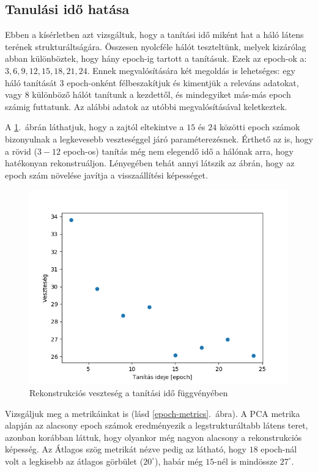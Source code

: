 \subsection{Tanulási idő hatása}

Ebben a kísérletben azt vizsgáltuk, hogy a tanítási idő miként hat a háló látens terének strukturáltságára. Összesen nyolcféle hálót teszteltünk, melyek kizárólag abban különböztek, hogy hány epoch-ig tartott a tanításuk. Ezek az epoch-ok a: $3, 6, 9, 12, 15, 18, 21, 24$. Ennek megvalósítására két megoldás is lehetséges: egy háló tanítását $3$ epoch-onként félbeszakítjuk és kimentjük a releváns adatokat, vagy $8$ különböző hálót tanítunk a kezdettől, és mindegyiket más-más epoch számig futtatunk. Az alábbi adatok az utóbbi megvalósításával keletkeztek.

A \ref{epoch-loss}.~ábrán láthatjuk, hogy a zajtól eltekintve a $15$ és $24$ közötti epoch számok bizonyulnak a legkevesebb veszteséggel járó paraméterezésnek. Érthető az is, hogy a rövid ($3-12$ epoch-os) tanítás még nem elegendő idő a hálónak arra, hogy hatékonyan rekonstruáljon. Lényegében tehát annyi látszik az ábrán, hogy az epoch szám növelése javítja a visszaállítési képességet.

\begin{figure}[h!]
\begin{center}
 \begin{center}
	\includegraphics[width=0.75\linewidth]{metrics/vae_epoch-loss.png}
 \end{center}

  \caption{Rekonstrukciós veszteség a tanítási idő függvényében}\label{epoch-loss}
\end{center}
\end{figure}

Vizsgáljuk meg a metrikáinkat is (lásd \ref{epoch-metrics}.~ábra). A PCA metrika alapján az alacsony epoch számok eredményezik a legstrukturáltabb látens teret, azonban korábban láttuk, hogy olyankor még nagyon alacsony a rekonstrukciós képesség. Az Átlagos szög metrikát nézve pedig az látható, hogy $18$ epoch-nál volt a legkisebb az átlagos görbület ($20^\circ$), habár még $15$-nél is mindössze $27^\circ$.

